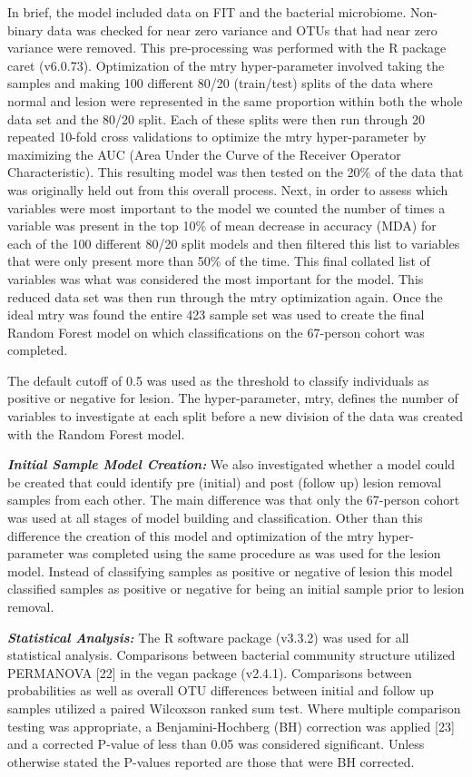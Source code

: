 \documentclass[12pt,]{article}
\begin{document}
In brief, the model included data on FIT and the bacterial microbiome.
Non-binary data was checked for near zero variance and OTUs that had
near zero variance were removed. This pre-processing was performed with
the R package caret (v6.0.73). Optimization of the mtry hyper-parameter
involved taking the samples and making 100 different 80/20 (train/test)
splits of the data where normal and lesion were represented in the same
proportion within both the whole data set and the 80/20 split. Each of
these splits were then run through 20 repeated 10-fold cross validations
to optimize the mtry hyper-parameter by maximizing the AUC (Area Under
the Curve of the Receiver Operator Characteristic). This resulting model
was then tested on the 20\% of the data that was originally held out
from this overall process. Next, in order to assess which variables were
most important to the model we counted the number of times a variable
was present in the top 10\% of mean decrease in accuracy (MDA) for each
of the 100 different 80/20 split models and then filtered this list to
variables that were only present more than 50\% of the time. This final
collated list of variables was what was considered the most important
for the model. This reduced data set was then run through the mtry
optimization again. Once the ideal mtry was found the entire 423 sample
set was used to create the final Random Forest model on which
classifications on the 67-person cohort was completed.

The default cutoff of 0.5 was used as the threshold to classify
individuals as positive or negative for lesion. The hyper-parameter,
mtry, defines the number of variables to investigate at each split
before a new division of the data was created with the Random Forest
model.

\textbf{\emph{Initial Sample Model Creation:}} We also investigated
whether a model could be created that could identify pre (initial) and
post (follow up) lesion removal samples from each other. The main
difference was that only the 67-person cohort was used at all stages of
model building and classification. Other than this difference the
creation of this model and optimization of the mtry hyper-parameter was
completed using the same procedure as was used for the lesion model.
Instead of classifying samples as positive or negative of lesion this
model classified samples as positive or negative for being an initial
sample prior to lesion removal.

\textbf{\emph{Statistical Analysis:}} The R software package (v3.3.2)
was used for all statistical analysis. Comparisons between bacterial
community structure utilized PERMANOVA {[}22{]} in the vegan package
(v2.4.1). Comparisons between probabilities as well as overall OTU
differences between initial and follow up samples utilized a paired
Wilcoxson ranked sum test. Where multiple comparison testing was
appropriate, a Benjamini-Hochberg (BH) correction was applied {[}23{]}
and a corrected P-value of less than 0.05 was considered significant.
Unless otherwise stated the P-values reported are those that were BH
corrected.
\end{document}
